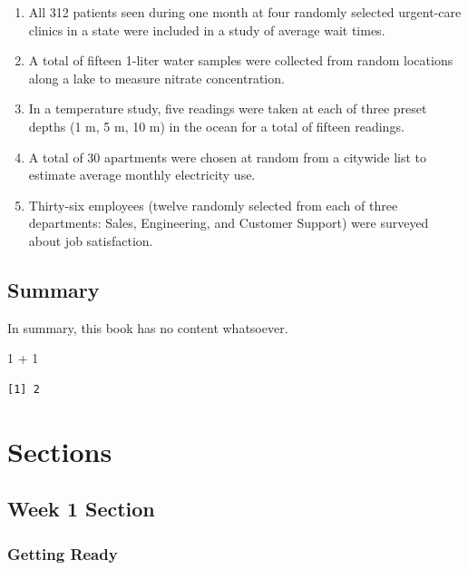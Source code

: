 \documentclass[
  letterpaper,
  DIV=11,
  numbers=noendperiod]{scrreprt}
\newenvironment{Shaded}{\begin{snugshade}}{\end{snugshade}}
\newcommand{\DecValTok}[1]{\textcolor[rgb]{0.68,0.00,0.00}{#1}}
\newcommand{\SpecialCharTok}[1]{\textcolor[rgb]{0.37,0.37,0.37}{#1}}
\begin{document}
\begin{enumerate}
\def\labelenumi{(\alph{enumi})}
\item
  All 312 patients seen during one month at four randomly selected
  urgent-care clinics in a state were included in a study of average
  wait times.
\item
  A total of fifteen 1-liter water samples were collected from random
  locations along a lake to measure nitrate concentration.
\item
  In a temperature study, five readings were taken at each of three
  preset depths (1 m, 5 m, 10 m) in the ocean for a total of fifteen
  readings.
\item
  A total of 30 apartments were chosen at random from a citywide list to
  estimate average monthly electricity use.
\item
  Thirty-six employees (twelve randomly selected from each of three
  departments: Sales, Engineering, and Customer Support) were surveyed
  about job satisfaction.
\end{enumerate}


\chapter{Summary}\label{summary}

In summary, this book has no content whatsoever.

\begin{Shaded}
\begin{Highlighting}[]
\DecValTok{1} \SpecialCharTok{+} \DecValTok{1}
\end{Highlighting}
\end{Shaded}

\begin{verbatim}
[1] 2
\end{verbatim}

\part{Sections}

\chapter{Week 1 Section}\label{week-1-section}

\section{Getting Ready}\label{getting-ready}
\end{document}
